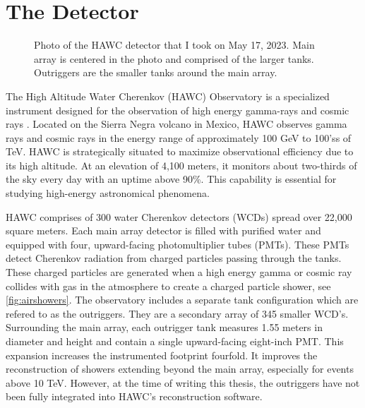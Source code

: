 \section{The Detector}\label{sec:THE_hawc}

\begin{figure}[h!]
    \caption{Photo of the HAWC detector that I took on May 17, 2023. Main array is centered in the photo and comprised of the larger tanks. Outriggers are the smaller tanks around the main array.}
    \label{fig:HAWC}
\end{figure}

The High Altitude Water Cherenkov (HAWC) Observatory is a specialized instrument designed for the observation of high energy gamma-rays and cosmic rays \cite{HAWC_NIM}.
Located on the Sierra Negra volcano in Mexico, HAWC observes gamma rays and cosmic rays in the energy range of approximately 100 GeV to 100'ss of TeV.
HAWC is strategically situated to maximize observational efficiency due to its high altitude.
At an elevation of 4,100 meters, it monitors about two-thirds of the sky every day with an uptime above 90\%.
This capability is essential for studying high-energy astronomical phenomena.

HAWC comprises of 300 water Cherenkov detectors (WCDs) spread over 22,000 square meters.
Each main array detector is filled with purified water and equipped with four, upward-facing photomultiplier tubes (PMTs).
These PMTs detect Cherenkov radiation from charged particles passing through the tanks.
These charged particles are generated when a high energy gamma or cosmic ray collides with gas in the atmosphere to create a charged particle shower, see \cref{fig:airshowers}.
The observatory includes a separate tank configuration which are refered to as the outriggers.
They are a secondary array of 345 smaller WCD's.
Surrounding the main array, each outrigger tank measures 1.55 meters in diameter and height and contain a single upward-facing eight-inch PMT.
This expansion increases the instrumented footprint fourfold.
It improves the reconstruction of showers extending beyond the main array, especially for events above 10 TeV.
However, at the time of writing this thesis, the outriggers have not been fully integrated into HAWC's reconstruction software.

